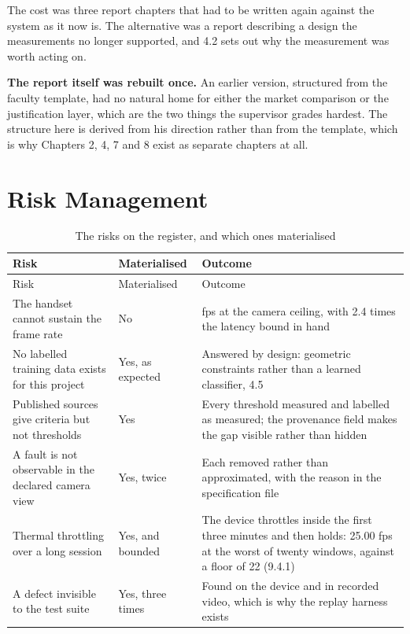 The cost was three report chapters that had to be written again against the system as it now is. The alternative was a report describing a design the measurements no longer supported, and 4.2 sets out why the measurement was worth acting on.

\textbf{The report itself was rebuilt once.} An earlier version, structured from the faculty template, had no natural home for either the market comparison or the justification layer, which are the two things the supervisor grades hardest. The structure here is derived from his direction rather than from the template, which is why Chapters 2, 4, 7 and 8 exist as separate chapters at all.

\section{Risk Management}
\label{sec:11.2}

{\small
\setlength{\LTpre}{6pt}\setlength{\LTpost}{8pt}
\begin{longtable}{>{\raggedright\arraybackslash}p{}>{\raggedright\arraybackslash}p{}>{\raggedright\arraybackslash}p{}}
\caption{The risks on the register, and which ones materialised}\\
\toprule
Risk & Materialised & Outcome \\
\midrule
\endfirsthead
\toprule
Risk & Materialised & Outcome \\
\midrule
\endhead
\bottomrule
\endfoot
\bottomrule
\endlastfoot
The handset cannot sustain the frame rate & No & 29.57 fps at the camera ceiling, with 2.4 times the latency bound in hand \\
No labelled training data exists for this project & Yes, as expected & Answered by design: geometric constraints rather than a learned classifier, 4.5 \\
Published sources give criteria but not thresholds & Yes & Every threshold measured and labelled as measured; the provenance field makes the gap visible rather than hidden \\
A fault is not observable in the declared camera view & Yes, twice & Each removed rather than approximated, with the reason in the specification file \\
Thermal throttling over a long session & Yes, and bounded & The device throttles inside the first three minutes and then holds: 25.00 fps at the worst of twenty windows, against a floor of 22 (9.4.1) \\
A defect invisible to the test suite & Yes, three times & Found on the device and in recorded video, which is why the replay harness exists \\
\end{longtable}
}

